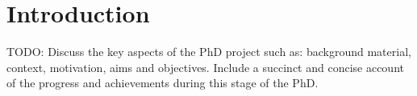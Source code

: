 \section{Introduction}
TODO: Discuss the key aspects of the PhD project such as: background material, context, motivation, aims and objectives. Include a succinct and concise account of the progress and achievements during this stage of the PhD.